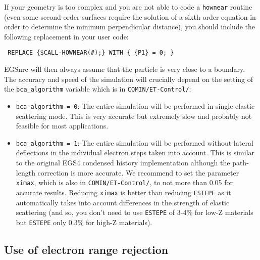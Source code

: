 If your geometry is too complex and you are not 
able to code a {\tt hownear} routine (even some 
second order surfaces require the solution of 
a sixth order equation in order to determine the 
minimum perpendicular distance), you should include the 
following replacement in your user code:
\begin{flushleft}{\tt
REPLACE \{\$CALL-HOWNEAR(\#);\} WITH \{ \{P1\} = 0; \} }
\end{flushleft}
EGSnrc will then always assume that the particle is very 
close to a boundary. The accuracy and speed of the simulation 
will crucially 
depend on the setting of the {\tt bca\_algorithm} variable 
which is in {\tt COMIN/ET-Control/}:
\begin{itemize}
\item
{\tt bca\_algorithm = 0}: The entire simulation will be 
performed in single elastic scattering mode. This is 
very accurate but extremely slow and probably not feasible 
for most applications.
\item
{\tt bca\_algorithm = 1}: The entire simulation will 
be performed without lateral deflections in the individual 
electron steps taken into account. This is similar to the 
original EGS4 condensed history implementation although 
the path-length correction is more accurate. We recommend 
to set the parameter {\tt ximax}, which is also in 
{\tt COMIN/ET-Control/}, to not more than 0.05 for accurate 
results. Reducing {\tt ximax} is better than reducing 
{\tt ESTEPE} as it automatically takes into account 
differences in the strength of elastic scattering 
(and so, you don't need to use {\tt ESTEPE} of 3-4\% 
for low-Z materials but {\tt ESTEPE} only 0.3\% for 
high-Z materials). 
\end{itemize}

\subsection{Use of electron range rejection}
\label{range_change}


